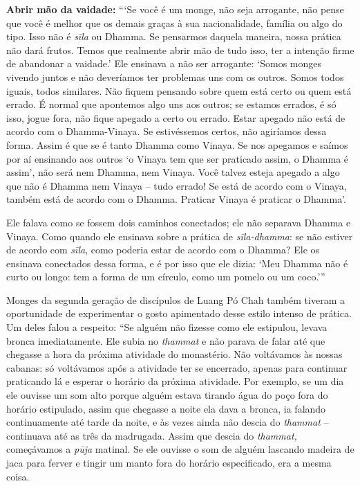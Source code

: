 \textbf{Abrir mão da vaidade:} ```Se você é um monge, não seja arrogante, não
pense que você é melhor que os demais graças à sua nacionalidade, família ou
algo do tipo. Isso não é \emph{sīla} ou Dhamma. Se pensarmos daquela maneira,
nossa prática não dará frutos. Temos que realmente abrir mão de tudo isso, ter a
intenção firme de abandonar a vaidade.' Ele ensinava a não ser arrogante: `Somos
monges vivendo juntos e não deveríamos ter problemas uns com os outros. Somos
todos iguais, todos similares. Não fiquem pensando sobre quem está certo ou quem
está errado. É normal que apontemos algo uns aos outros; se estamos errados, é
só isso, jogue fora, não fique apegado a certo ou errado. Estar apegado não está
de acordo com o Dhamma-Vinaya. Se estivéssemos certos, não agiríamos dessa
forma. Assim é que se é tanto Dhamma como Vinaya. Se nos apegamos e saímos por
aí ensinando aos outros `o Vinaya tem que ser praticado assim, o Dhamma é
assim', não será nem Dhamma, nem Vinaya. Você talvez esteja apegado a algo que
não é Dhamma nem Vinaya -- tudo errado! Se está de acordo com o Vinaya, também
está de acordo com o Dhamma. Praticar Vinaya é praticar o Dhamma'.

Ele falava como se fossem dois caminhos conectados; ele não separava
Dhamma e Vinaya. Como quando ele ensinava sobre a prática de
\emph{sīla-dhamma}: se não estiver de acordo com \emph{sīla}, como
poderia estar de acordo com o Dhamma? Ele os ensinava conectados dessa
forma, e é por isso que ele dizia: `Meu Dhamma não é curto ou longo: tem
a forma de um círculo, como um pomelo ou um coco.'''

Monges da segunda geração de discípulos de Luang Pó Chah também tiveram
a oportunidade de experimentar o gosto apimentado desse estilo intenso
de prática. Um deles falou a respeito: ``Se alguém não fizesse como ele
estipulou, levava bronca imediatamente. Ele subia no \emph{thammat} e
não parava de falar até que chegasse a hora da próxima atividade do
monastério. Não voltávamos às nossas cabanas: só voltávamos após a
atividade ter se encerrado, apenas para continuar praticando lá e
esperar o horário da próxima atividade. Por exemplo, se um dia ele
ouvisse um som alto porque alguém estava tirando água do poço fora do
horário estipulado, assim que chegasse a noite ela dava a bronca, ia
falando continuamente até tarde da noite, e às vezes ainda não descia do
\emph{thammat} -- continuava até as três da madrugada. Assim que descia
do \emph{thammat,} começávamos a \emph{pūja} matinal. Se ele ouvisse o
som de alguém lascando madeira de jaca para ferver e tingir um manto
fora do horário especificado, era a mesma coisa.

